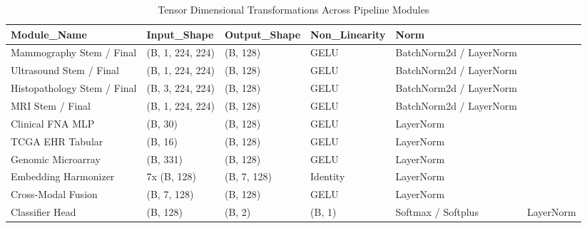 \begin{table}
\caption{Tensor Dimensional Transformations Across Pipeline Modules}
\begin{tabular}{lllll}
\toprule
Module_Name & Input_Shape & Output_Shape & Non_Linearity & Norm \\
\midrule
Mammography Stem / Final & (B, 1, 224, 224) & (B, 128) & GELU & BatchNorm2d / LayerNorm \\
Ultrasound Stem / Final & (B, 1, 224, 224) & (B, 128) & GELU & BatchNorm2d / LayerNorm \\
Histopathology Stem / Final & (B, 3, 224, 224) & (B, 128) & GELU & BatchNorm2d / LayerNorm \\
MRI Stem / Final & (B, 1, 224, 224) & (B, 128) & GELU & BatchNorm2d / LayerNorm \\
Clinical FNA MLP & (B, 30) & (B, 128) & GELU & LayerNorm \\
TCGA EHR Tabular & (B, 16) & (B, 128) & GELU & LayerNorm \\
Genomic Microarray & (B, 331) & (B, 128) & GELU & LayerNorm \\
Embedding Harmonizer & 7x (B, 128) & (B, 7, 128) & Identity & LayerNorm \\
Cross-Modal Fusion & (B, 7, 128) & (B, 128) & GELU & LayerNorm \\
Classifier Head & (B, 128) & (B, 2) & (B, 1) & Softmax / Softplus & LayerNorm \\
\bottomrule
\end{tabular}
\end{table}
